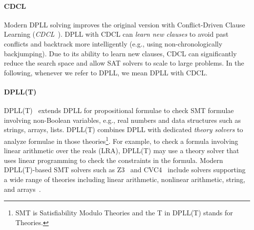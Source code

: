 \documentclass[oneside,11pt,dvipsnames]{book}
\numberwithin{equation}{section}
\theoremstyle{definition}
\theoremstyle{remark}
\begin{document}


\paragraph{CDCL} Modern DPLL solving improves the original version with Conflict-Driven Clause Learning (\emph{CDCL}~\cite{bayardo1997using,marques1999grasp,569607}).
DPLL with CDCL can \emph{learn new clauses} to avoid past conflicts and backtrack more intelligently (e.g., using non-chronologically backjumping).
Due to its ability to learn new clauses, CDCL can significantly  reduce the search space and allow SAT solvers to scale to large problems.
In the following, whenever we refer to DPLL, we mean DPLL with CDCL.

\paragraph{DPLL(T)} DPLL(T)~\cite{nieuwenhuis2006solving} extends DPLL for propositional formulae to check SMT formulae involving non-Boolean variables, e.g., real numbers and data structures such as strings, arrays, lists.
DPLL(T) combines DPLL with dedicated \emph{theory solvers} to analyze formulae in those theories\footnote{SMT is Satisfiability Modulo Theories and the T in DPLL(T) stands for Theories.}.  %
For example, to check a formula involving linear arithmetic over the reals (LRA), DPLL(T) may use a theory solver that uses linear programming to check the  constraints in the formula.
Modern DPLL(T)-based SMT solvers such as Z3~\cite{moura2008z3} and CVC4~\cite{barrett2011cvc4} 
include solvers supporting a wide range of theories including linear arithmetic, nonlinear arithmetic, string, and arrays~\cite{kroening2016decision}.
\end{document}
